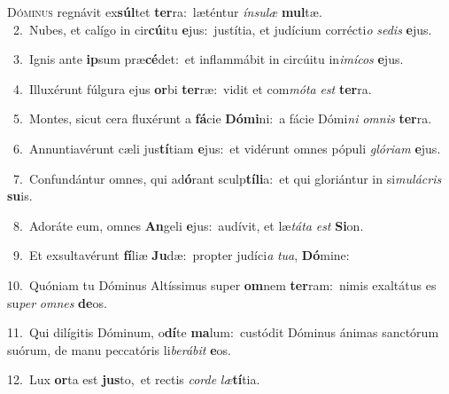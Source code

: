 \lettrine{\initial\textcolor{\initialcolor}{D}}{óminus} regnávit ex\-\textbf{súl}\-tet \textbf{ter}\-ra:~\star læténtur \textit{ín}\-\textit{su}\textit{læ} \textbf{mul}\-tæ.\\
{\numbfont\textcolor{\numbcolor}{~2.}}~Nubes, et calígo in cir\-\textbf{cú}\-itu \textbf{e}\-jus:~\star justítia, et judícium corrécti\textit{o} \textit{se}\-\textit{dis} \textbf{e}\-jus.\par
{\numbfont\textcolor{\numbcolor}{~3.}}~Ignis ante \textbf{ip}\-sum præ\-\textbf{cé}\-det:~\star et inflammábit in circúitu in\-\textit{i}\-\textit{mí}\textit{cos} \textbf{e}\-jus.\par
{\numbfont\textcolor{\numbcolor}{~4.}}~Illuxérunt fúlgura ejus \textbf{or}\-bi \textbf{ter}\-ræ:~\star vidit et com\-\textit{mó}\-\textit{ta} \textit{est} \textbf{ter}\-ra.\par
{\numbfont\textcolor{\numbcolor}{~5.}}~Montes, sicut cera fluxérunt a \textbf{fá}\-cie \textbf{Dó}\-\textbf{mi}ni:~\star a fácie Dómi\textit{ni} \textit{om}\-\textit{nis} \textbf{ter}\-ra.\par
{\numbfont\textcolor{\numbcolor}{~6.}}~Annuntiavérunt cæli jus\-\textbf{tí}\-tiam \textbf{e}\-jus:~\star et vidérunt omnes pópuli \textit{gló}\-\textit{ri}\textit{am} \textbf{e}\-jus.\par
{\numbfont\textcolor{\numbcolor}{~7.}}~Confundántur omnes, qui ad\-\textbf{ó}\-rant sculp\-\textbf{tí}\-\textbf{li}a:~\star et qui gloriántur in si\-\textit{mu}\-\textit{lá}\textit{cris} \textbf{su}\-is.\par
{\numbfont\textcolor{\numbcolor}{~8.}}~Adoráte eum, omnes \textbf{An}\-geli \textbf{e}\-jus:~\star audívit, et læ\-\textit{tá}\-\textit{ta} \textit{est} \textbf{Si}\-on.\par
{\numbfont\textcolor{\numbcolor}{~9.}}~Et exsultavérunt \textbf{fí}\-liæ \textbf{Ju}\-dæ:~\star propter judíci\textit{a} \textit{tu}\-\textit{a}, \textbf{Dó}\-mine:\par
{\numbfont\textcolor{\numbcolor}{10.}}~Quóniam tu Dóminus Altíssimus super \textbf{om}\-nem \textbf{ter}\-ram:~\star nimis exaltátus es su\textit{per} \textit{om}\-\textit{nes} \textbf{de}\-os.\par
{\numbfont\textcolor{\numbcolor}{11.}}~Qui dilígitis Dóminum, o\-\textbf{dí}\-te \textbf{ma}\-lum:~\star custódit Dóminus ánimas sanctórum suórum, de manu peccatóris li\-\textit{be}\-\textit{rá}\textit{bit} \textbf{e}\-os.\par
{\numbfont\textcolor{\numbcolor}{12.}}~Lux \textbf{or}\-ta est \textbf{jus}\-to,~\star et rectis \textit{cor}\-\textit{de} \textit{læ}\-\textbf{tí}tia.\par
